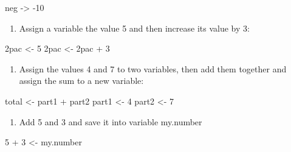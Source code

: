 \documentclass[
  letterpaper,
  DIV=11,
  numbers=noendperiod]{scrreprt}
\newenvironment{Shaded}{\begin{snugshade}}{\end{snugshade}}
\newcommand{\DecValTok}[1]{\textcolor[rgb]{0.68,0.00,0.00}{#1}}
\newcommand{\NormalTok}[1]{\textcolor[rgb]{0.00,0.23,0.31}{#1}}
\newcommand{\OtherTok}[1]{\textcolor[rgb]{0.00,0.23,0.31}{#1}}
\newcommand{\SpecialCharTok}[1]{\textcolor[rgb]{0.37,0.37,0.37}{#1}}
\providecommand{\tightlist}{%
  \setlength{\itemsep}{0pt}\setlength{\parskip}{0pt}}\usepackage{longtable,booktabs,array}
\begin{document}
\begin{Shaded}
\begin{Highlighting}[]
\NormalTok{neg }\OtherTok{{-}\textgreater{}} \SpecialCharTok{{-}}\DecValTok{10}
\end{Highlighting}
\end{Shaded}

\begin{enumerate}
\def\labelenumi{\arabic{enumi}.}
\setcounter{enumi}{1}
\tightlist
\item
  Assign a variable the value 5 and then increase its value by 3:
\end{enumerate}

\begin{Shaded}
\begin{Highlighting}[]
\NormalTok{2pac }\OtherTok{\textless{}{-}} \DecValTok{5}
\NormalTok{2pac }\OtherTok{\textless{}{-}}\NormalTok{ 2pac }\SpecialCharTok{+} \DecValTok{3}
\end{Highlighting}
\end{Shaded}

\begin{enumerate}
\def\labelenumi{\arabic{enumi}.}
\setcounter{enumi}{2}
\tightlist
\item
  Assign the values 4 and 7 to two variables, then add them together and
  assign the sum to a new variable:
\end{enumerate}

\begin{Shaded}
\begin{Highlighting}[]
\NormalTok{total }\OtherTok{\textless{}{-}}\NormalTok{ part1 }\SpecialCharTok{+}\NormalTok{ part2}
\NormalTok{part1 }\OtherTok{\textless{}{-}} \DecValTok{4}
\NormalTok{part2 }\OtherTok{\textless{}{-}} \DecValTok{7}
\end{Highlighting}
\end{Shaded}

\begin{enumerate}
\def\labelenumi{\arabic{enumi}.}
\setcounter{enumi}{3}
\tightlist
\item
  Add 5 and 3 and save it into variable my.number
\end{enumerate}

\begin{Shaded}
\begin{Highlighting}[]
\DecValTok{5} \SpecialCharTok{+} \DecValTok{3} \OtherTok{\textless{}{-}}\NormalTok{ my.number}
\end{Highlighting}
\end{Shaded}
\end{document}
